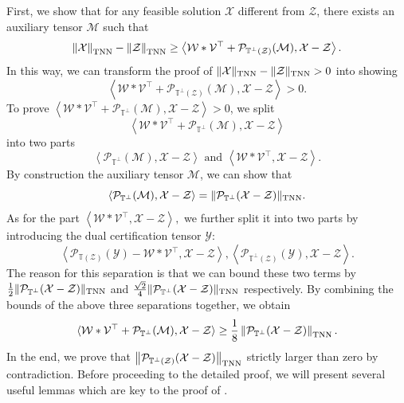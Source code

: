 \documentclass[twoside,12pt]{article}
\newcommand{\TNN}{\textnormal{TNN}}
\begin{document}
First, we  show that for any feasible solution $\mathcal{X}$ different from $\mathcal{Z}$, there exists an auxiliary tensor $\mathcal{M}$ such that
\[
\left\|\mathcal{X}\right\|_{\TNN} - \left\|\mathcal{Z}\right\|_{\TNN} \geq \left\langle \mathcal{W}*\mathcal{V}^{\top}+\mathcal{P}_{\mathbb{T}^{\perp}(\mathcal{Z})}(\mathcal{M}), \mathcal{X}-\mathcal{Z}\right\rangle.\]
In this way, we can transform the proof of  $\|\mathcal{X}\|_{\TNN} -\|\mathcal{Z}\|_{\TNN}>0$ into showing \[\left\langle \mathcal{W}*\mathcal{V}^{\top}+\mathcal{P}_{\mathbb{T}^{\perp}(\mathcal{Z})}(\mathcal{M}), \mathcal{X}-\mathcal{Z}\right\rangle>0.\] To prove $\left\langle \mathcal{W}*\mathcal{V}^{\top}+\mathcal{P}_{\mathbb{T}^{\perp}}(\mathcal{M}), \mathcal{X}-\mathcal{Z}\right\rangle>0$, we split \[\left\langle \mathcal{W}*\mathcal{V}^{\top}+\mathcal{P}_{\mathbb{T}^{\perp}}(\mathcal{M}), \mathcal{X}-\mathcal{Z}\right\rangle\] into two parts \[\left\langle \mathcal{P}_{\mathbb{T}^{\perp}}(\mathcal{M}), \mathcal{X}-\mathcal{Z}\right\rangle \text{ and } 
 \left\langle \mathcal{W}*\mathcal{V}^{\top},\mathcal{X}-\mathcal{Z}\right\rangle.\]
 By construction the auxiliary tensor $\mathcal{M}$, we can show that \[\left\langle \mathcal{P}_{\mathbb{T}^{\perp}}(\mathcal{M}), \mathcal{X}-\mathcal{Z}\right\rangle=\|\mathcal{P}_{\mathbb{T}^{\perp}}(\mathcal{X}-\mathcal{Z})\|_{\TNN}.\]
 As for the part $\left\langle \mathcal{W}*\mathcal{V}^{\top},\mathcal{X}-\mathcal{Z}\right\rangle,$ we further split it into two parts by introducing the dual certification tensor $\mathcal{Y}$: \[\left\langle \mathcal{P}_{\mathbb{T}(\mathcal{Z})}(\mathcal{Y})-\mathcal{W}*\mathcal{V}^{\top},\mathcal{X}-\mathcal{Z}\right\rangle , \left\langle \mathcal{P}_{\mathbb{T}^{\perp}(\mathcal{Z})}(\mathcal{Y}),\mathcal{X}-\mathcal{Z}\right\rangle.\]
 The reason for this separation is that we can bound these two terms by  $\frac{1}{2}\|\mathcal{P}_{\mathbb{T}^{\perp}}(\mathcal{X}-\mathcal{Z})\|_{\TNN}$ and  $\frac{\sqrt{2}}{4}\|\mathcal{P}_{\mathbb{T}^{\perp}}(\mathcal{X}-\mathcal{Z})\|_{\TNN}$ respectively. By combining the bounds of the above three separations together, we obtain  \[\langle\mathcal{W}*\mathcal{V}^{\top}+\mathcal{P}_{\mathbb{T}^{\perp}}(\mathcal{M}),\mathcal{X}-\mathcal{Z}\rangle\geq \frac{1}{8}\left\|\mathcal{P}_{\mathbb{T}^{\perp}}(\mathcal{X}-\mathcal{Z})\right\|_{\TNN}.\] 
 In the end, we prove that $\left\|\mathcal{P}_{\mathbb{T}^{\perp}(\mathcal{Z})}(\mathcal{X}-\mathcal{Z})\right\|_{\TNN}$ strictly larger than zero by contradiction. Before proceeding to the detailed proof, we will present several useful lemmas which are key to the proof of . 
\end{document}
